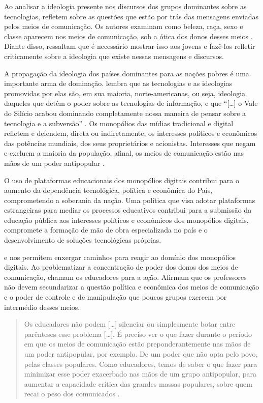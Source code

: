 \documentclass[portuguese]{textolivre}
\begin{document}
Ao analisar a ideologia presente nos discursos dos grupos dominantes sobre as tecnologias, \textcite{freire_educar_2011} refletem sobre as questões que estão por trás das mensagens enviadas pelos meios de comunicação. Os autores examinam como beleza, raça, sexo e classe aparecem nos meios de comunicação, sob a ótica dos donos desses meios \cite{freire_educar_2011}. Diante disso, \textcite{freire_educar_2011} ressaltam que é necessário mostrar isso aos jovens e fazê-los refletir criticamente sobre a ideologia que existe nessas mensagens e discursos.

A propagação da ideologia dos países dominantes para as nações pobres é uma importante arma de dominação. \textcite{morozov2018} lembra que as tecnologias e as ideologias promovidas por elas são, em sua maioria, norte-americanas, ou seja, ideologia daqueles que detêm o poder sobre as tecnologias de informação, e que “[…] o Vale do Silício acabou dominando completamente nossa maneira de pensar sobre a tecnologia e a subversão” \cite[p. 16]{morozov2018}. Os monopólios das mídias tradicional e digital refletem e defendem, direta ou indiretamente, os interesses políticos e econômicos das potências mundiais, dos seus proprietários e acionistas. Interesses que negam e excluem a maioria da população, afinal, os meios de comunicação estão nas mãos de um poder antipopular \cite{freire_educar_2011}.

O uso de plataformas educacionais dos monopólios digitais contribui para o aumento da dependência tecnológica, política e econômica do País, comprometendo a soberania da nação. Uma política que visa adotar plataformas estrangeiras para mediar os processos educativos contribui para a submissão da educação pública aos interesses políticos e econômicos dos monopólios digitais, compromete a formação de mão de obra especializada no país e o desenvolvimento de soluções tecnológicas próprias.

\textcite{freire_educar_2011} e \textcite{morozov2018} nos permitem enxergar caminhos para reagir ao domínio dos monopólios digitais. Ao problematizar a concentração de poder dos donos dos meios de comunicação, \cite{freire_educar_2011} chamam os educadores para a ação. Afirmam que os professores não devem secundarizar a questão política e econômica dos meios de comunicação e o poder de controle e de manipulação que poucos grupos exercem por intermédio desses meios.

\begin{quote}
 Os educadores não podem […] silenciar ou simplesmente botar entre parênteses esse problema […]. É preciso ver o que fazer durante o período em que os meios de comunicação estão preponderantemente nas mãos de um poder antipopular, por exemplo. De um poder que não opta pelo povo, pelas classes populares. Como educadores, temos de saber o que fazer para minimizar esse poder exacerbado nas mãos de um grupo antipopular, para aumentar a capacidade crítica das grandes massas populares, sobre quem recai o peso dos comunicados \cite[p. 33]{freire_educar_2011}.
\end{quote}
\end{document}
